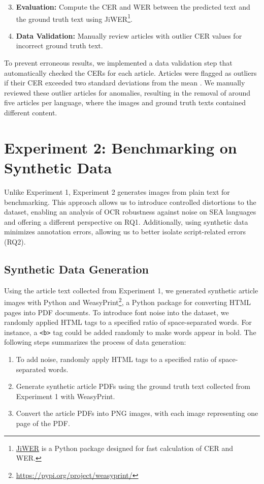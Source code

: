 \documentclass[12pt,oneside]{memoir}
\begin{document}
\begin{enumerate}
    \setcounter{enumi}{2}
    \item \textbf{Evaluation:} Compute the CER and WER between the predicted text and the ground truth text using JiWER\footnote{\href{https://pypi.org/project/jiwer/}{JiWER} is a Python package designed for fast calculation of CER and WER.}.
    \item \textbf{Data Validation:} Manually review articles with outlier CER values for incorrect ground truth text.
\end{enumerate}

To prevent erroneous results, we implemented a data validation step that automatically checked the CERs for each article.
Articles were flagged as outliers if their CER exceeded two standard deviations from the mean \parencite{cousineau-and-chartier-2010}. 
We manually reviewed these outlier articles for anomalies, resulting in the removal of around five articles per language, where the images and ground truth texts contained different content.

\section{Experiment 2: Benchmarking on Synthetic Data}

Unlike Experiment 1, Experiment 2 generates images from plain text for benchmarking. 
This approach allows us to introduce controlled distortions to the dataset, enabling an analysis of OCR robustness against noise on SEA languages and offering a different perspective on RQ1.
Additionally, using synthetic data minimizes annotation errors, allowing us to better isolate script-related errors (RQ2).

\subsection{Synthetic Data Generation}

Using the article text collected from Experiment 1, we generated synthetic article images with Python and WeasyPrint\footnote{\url{https://pypi.org/project/weasyprint/}}, a Python package for converting HTML pages into PDF documents.
To introduce font noise into the dataset, we randomly applied HTML tags to a specified ratio of space-separated words.
For instance, a \texttt{<b>} tag could be added randomly to make words appear in bold.
The following steps summarizes the process of data generation:

\begin{enumerate}
    \item To add noise, randomly apply HTML tags to a specified ratio of space-separated words.
    \item Generate synthetic article PDFs using the ground truth text collected from Experiment 1 with WeasyPrint.
    \item Convert the article PDFs into PNG images, with each image representing one page of the PDF.
\end{enumerate}
\end{document}

